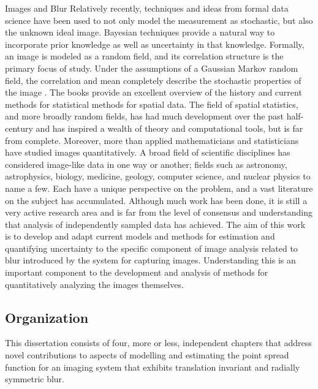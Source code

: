 \begin{chapter}{Images and Blur}
Relatively recently, techniques and ideas from formal data science have been used to not only model the measurement as stochastic, but also the unknown ideal image. 
Bayesian techniques provide a natural way to incorporate prior knowledge as well as uncertainty in that knowledge.
Formally, an image is modeled as a random field, and its correlation structure is the primary focus of study.
Under the assumptions of a Gaussian Markov random field, the correlation and mean completely describe the stochastic properties of the image \citep{rue2005gaussian}.
The books \citep{cressie1993statistics,rue2005gaussian} provide an excellent overview of the history and current methods for statistical methods for spatial data.
The field of spatial statistics, and more broadly random fields,  has had much development over the past half-century and has inspired a wealth of theory and computational tools, but is far from complete.
Moreover, more than applied mathematicians and statisticians have studied images quantitatively.
  A broad field of scientific disciplines has considered image-like data in one way or another; fields such as astronomy, astrophysics, biology, medicine, geology, computer science, and nuclear physics to name a few.
Each have a unique perspective on the problem, and a vast literature on the subject has accumulated.
Although much work has been done, it is still a very active research area and is far from the level of consensus and understanding that analysis of independently sampled data has achieved. 
The aim of this work is to develop and adapt current models and methods for estimation and quantifying uncertainty to the specific component of image analysis related to blur introduced by the system for capturing images.
Understanding this is an important component to the development and analysis of methods for quantitatively analyzing the images themselves.

\subsection{Organization}
This dissertation consists of four, more or less, independent chapters that address novel contributions to aspects of modelling and estimating the point spread function for an imaging system that exhibits translation invariant and radially symmetric blur.


\end{chapter}
